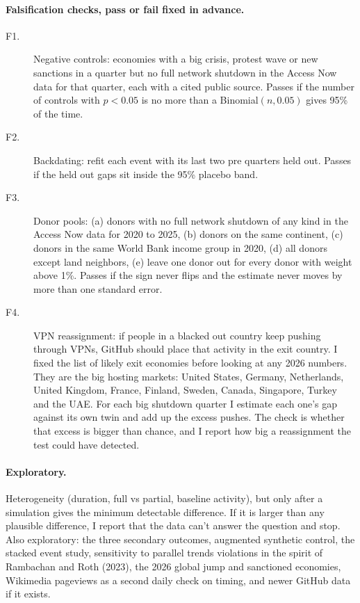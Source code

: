 \paragraph{Falsification checks, pass or fail fixed in advance.}
\begin{description}
\item[F1.] Negative controls: economies with a big crisis, protest wave or new sanctions in a quarter but no full network shutdown in the Access Now data for that quarter, each with a cited public source. Passes if the number of controls with $p<0.05$ is no more than a Binomial$(n, 0.05)$ gives 95\% of the time.
\item[F2.] Backdating: refit each event with its last two pre quarters held out. Passes if the held out gaps sit inside the 95\% placebo band.
\item[F3.] Donor pools: (a) donors with no full network shutdown of any kind in the Access Now data for 2020 to 2025, (b) donors on the same continent, (c) donors in the same World Bank income group in 2020, (d) all donors except land neighbors, (e) leave one donor out for every donor with weight above 1\%. Passes if the sign never flips and the estimate never moves by more than one standard error.
\item[F4.] VPN reassignment: if people in a blacked out country keep pushing through VPNs, GitHub should place that activity in the exit country. I fixed the list of likely exit economies before looking at any 2026 numbers. They are the big hosting markets: United States, Germany, Netherlands, United Kingdom, France, Finland, Sweden, Canada, Singapore, Turkey and the UAE. For each big shutdown quarter I estimate each one's gap against its own twin and add up the excess pushes. The check is whether that excess is bigger than chance, and I report how big a reassignment the test could have detected.
\end{description}

\paragraph{Exploratory.} Heterogeneity (duration, full vs partial, baseline activity), but only after a simulation gives the minimum detectable difference. If it is larger than any plausible difference, I report that the data can't answer the question and stop. Also exploratory: the three secondary outcomes, augmented synthetic control, the stacked event study, sensitivity to parallel trends violations in the spirit of Rambachan and Roth (2023), the 2026 global jump and sanctioned economies, Wikimedia pageviews as a second daily check on timing, and newer GitHub data if it exists.

